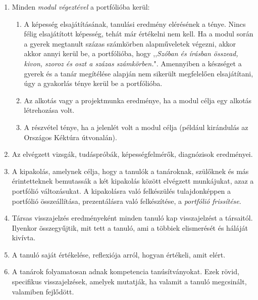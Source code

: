 \begin{enumerate}
      \item Minden \emph{modul végeztével} a portfólióba kerül:

            \begin{enumerate}

                  \item  A képesség elsajátításának, tanulási eredmény
                        elérésének a ténye.
                        Nincs
                        félig elsajátított képesség, tehát már értékelni nem
                        kell. Ha a modul során a gyerek megtanult százas számkörben alapműveletek
                        végezni, akkor
                        akkor
                        annyi kerül be, a portfólióba, hogy ,,\emph{Szóban és írásban
                              összead, kivon, szoroz és oszt a százas
                              számkörben.}". Amennyiben a
                        készséget a
                        gyerek és a
                        tanár megítélése alapján nem sikerült megfelelően
                        elsajátítani,
                        úgy a gyakorlás
                        ténye kerül be a portfólióba.
                  \item Az alkotás vagy a projektmunka eredménye, ha a modul
                        célja egy
                        alkotás
                        létrehozása volt.
                  \item A részvétel ténye, ha a jelenlét volt a modul célja
                        (például
                        kirándulás
                        az Országos Kéktúra útvonalán).

            \end{enumerate}
      \item Az elvégzett vizsgák, tudáspróbák, képességfelmérők, diagnózisok
            eredményei.

      \item A kipakolás, amelynek célja, hogy a tanulók a tanároknak, szülőknek
            és
            más érintetteknek bemutassák a két kipakolás között elvégzett
            munkájukat, azaz
            a portfólió változásukat. A kipakolásra való felkészülés
            tulajdonképpen
            a
            portfólió összeállítása, prezentálásra való felkészítése, a
            \emph{portfólió
                  frissítése}.

      \item Társas visszajelzés eredményeként minden tanuló kap visszajelzést a
            társaitól. Ilyenkor összegyűjtik, mit tett a tanuló, ami a többiek
            elismerését
            és háláját kivívta.

      \item A tanuló saját értékelése, reflexiója arról, hogyan értékeli, amit
            elért.

      \item A tanárok folyamatosan adnak kompetencia tanúsítványokat. Ezek
            rövid,
            specifikus visszajelzések, amelyek mutatják, ha valamit a tanuló
            megcsinált,
            valamiben fejlődött.
\end{enumerate}

